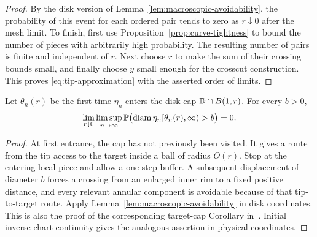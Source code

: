 \begin{proof}
By the disk version of Lemma~\ref{lem:macroscopic-avoidability},
the probability of this event for each ordered pair tends to zero
as $r\downarrow0$ after the mesh limit.  To finish, first use
Proposition~\ref{prop:curve-tightness} to bound the number of
pieces with arbitrarily high probability.  The resulting number
of pairs is finite and independent of $r$.  Next choose $r$ to
make the sum of their crossing bounds small, and finally choose
$y$ small enough for the crosscut construction.  This proves
\eqref{eq:tip-approximation} with the asserted order of limits.
\end{proof}

\begin{lemma}
\label{lem:no-return}
Let $\theta_n(r)$ be the first time $\eta_n$ enters the disk cap
$\D\cap B(1,r)$.  For every $b>0$,
\[
 \lim_{r\downarrow0}\limsup_{n\to\infty}
 \P\bigl(\operatorname{diam}
       \eta_n[\theta_n(r),\infty)>b\bigr)=0.
\]
\end{lemma}

\begin{proof}
At first entrance, the cap has not previously been visited.  It
gives a route from the tip access to the target inside a ball of
radius $O(r)$.  Stop at the entering local piece and allow a
one-step buffer.  A subsequent displacement of diameter $b$
forces a crossing from an enlarged inner rim to a fixed positive
distance, and every relevant annular component is avoidable
because of that tip-to-target route.  Apply
Lemma~\ref{lem:macroscopic-avoidability} in disk coordinates.
This is also the proof of the corresponding target-cap
Corollary in~\cite[Section ``Identification of the Dobrushin
strand'']{C}.  Initial inverse-chart continuity gives the
analogous assertion in physical coordinates.
\end{proof}
